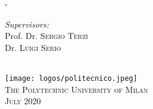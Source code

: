 \begin{titlingpage}
\begin{SingleSpace}
\begin{adjustwidth*}{\unitlength}{-\unitlength}
\begin{center}
\begin{minipage}{0.4\textwidth}
\begin{flushright} \large
\emph{Supervisors:} \\
Prof. Dr. \textsc{Sergio Terzi}\\
Dr. \textsc{Luigi Serio} 
\end{flushright}
\end{minipage}\\[2.5cm]
\vspace{-10mm}
\texttt{[image: logos/politecnico.jpeg]}\\
\vspace{6mm}
{\large %
\textsc{The Polytechnic University of Milan}}\\
\vspace{5mm}
\vspace{9mm}
{\large\textsc{July 2020}}
\vspace{12mm}
\end{center}
\end{adjustwidth*}
\end{SingleSpace}
\end{titlingpage}